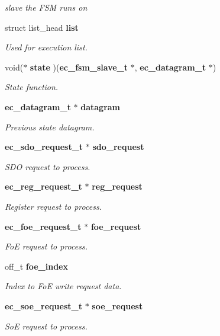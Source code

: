 \begin{DoxyCompactItemize}
\begin{DoxyCompactList}\small\item\em slave the \-F\-S\-M runs on \end{DoxyCompactList}\item 
struct list\-\_\-head {\bf list}
\begin{DoxyCompactList}\small\item\em \-Used for execution list. \end{DoxyCompactList}\item 
void($\ast$ {\bf state} )({\bf ec\-\_\-fsm\-\_\-slave\-\_\-t} $\ast$, {\bf ec\-\_\-datagram\-\_\-t} $\ast$)
\begin{DoxyCompactList}\small\item\em \-State function. \end{DoxyCompactList}\item 
{\bf ec\-\_\-datagram\-\_\-t} $\ast$ {\bf datagram}
\begin{DoxyCompactList}\small\item\em \-Previous state datagram. \end{DoxyCompactList}\item 
{\bf ec\-\_\-sdo\-\_\-request\-\_\-t} $\ast$ {\bf sdo\-\_\-request}
\begin{DoxyCompactList}\small\item\em \-S\-D\-O request to process. \end{DoxyCompactList}\item 
{\bf ec\-\_\-reg\-\_\-request\-\_\-t} $\ast$ {\bf reg\-\_\-request}
\begin{DoxyCompactList}\small\item\em \-Register request to process. \end{DoxyCompactList}\item 
{\bf ec\-\_\-foe\-\_\-request\-\_\-t} $\ast$ {\bf foe\-\_\-request}
\begin{DoxyCompactList}\small\item\em \-Fo\-E request to process. \end{DoxyCompactList}\item 
off\-\_\-t {\bf foe\-\_\-index}
\begin{DoxyCompactList}\small\item\em \-Index to \-Fo\-E write request data. \end{DoxyCompactList}\item 
{\bf ec\-\_\-soe\-\_\-request\-\_\-t} $\ast$ {\bf soe\-\_\-request}
\begin{DoxyCompactList}\small\item\em \-So\-E request to process. \end{DoxyCompactList}\item 

\end{DoxyCompactItemize}

